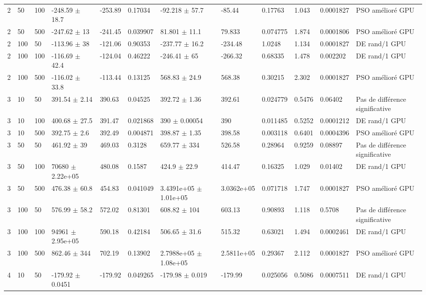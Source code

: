 \begin{table}[t]
\begin{tabular}{llllllllllll}
2 & 50 & 100 & -248.59 $\pm$ 18.7 & -253.89 & 0.17034 & -92.218 $\pm$ 57.7 & -85.44 & 0.17763 & 1.043 & 0.0001827 & PSO amélioré GPU \\
2 & 50 & 500 & -247.62 $\pm$ 13 & -241.45 & 0.039907 & 81.801 $\pm$ 11.1 & 79.833 & 0.074775 & 1.874 & 0.0001806 & PSO amélioré GPU \\
2 & 100 & 50 & -113.96 $\pm$ 38 & -121.06 & 0.90353 & -237.77 $\pm$ 16.2 & -234.48 & 1.0248 & 1.134 & 0.0001827 & DE rand/1 GPU \\
2 & 100 & 100 & -116.69 $\pm$ 42.4 & -124.04 & 0.46222 & -246.41 $\pm$ 65 & -266.32 & 0.68335 & 1.478 & 0.002202 & DE rand/1 GPU \\
2 & 100 & 500 & -116.02 $\pm$ 33.8 & -113.44 & 0.13125 & 568.83 $\pm$ 24.9 & 568.38 & 0.30215 & 2.302 & 0.0001827 & PSO amélioré GPU \\
3 & 10 & 50 & 391.54 $\pm$ 2.14 & 390.63 & 0.04525 & 392.72 $\pm$ 1.36 & 392.61 & 0.024779 & 0.5476 & 0.06402 & Pas de différence significative \\
3 & 10 & 100 & 400.68 $\pm$ 27.5 & 391.47 & 0.021868 & 390 $\pm$ 0.00054 & 390 & 0.011485 & 0.5252 & 0.0001212 & DE rand/1 GPU \\
3 & 10 & 500 & 392.75 $\pm$ 2.6 & 392.49 & 0.004871 & 398.87 $\pm$ 1.35 & 398.58 & 0.003118 & 0.6401 & 0.0004396 & PSO amélioré GPU \\
3 & 50 & 50 & 461.92 $\pm$ 39 & 469.03 & 0.3128 & 659.77 $\pm$ 334 & 526.58 & 0.28964 & 0.9259 & 0.08897 & Pas de différence significative \\
3 & 50 & 100 & 70680 $\pm$ 2.22e+05 & 480.08 & 0.1587 & 424.9 $\pm$ 22.9 & 414.47 & 0.16325 & 1.029 & 0.01402 & DE rand/1 GPU \\
3 & 50 & 500 & 476.38 $\pm$ 60.8 & 454.83 & 0.041049 & 3.4391e+05 $\pm$ 1.01e+05 & 3.0362e+05 & 0.071718 & 1.747 & 0.0001827 & PSO amélioré GPU \\
3 & 100 & 50 & 576.99 $\pm$ 58.2 & 572.02 & 0.81301 & 608.82 $\pm$ 104 & 603.13 & 0.90893 & 1.118 & 0.5708 & Pas de différence significative \\
3 & 100 & 100 & 94961 $\pm$ 2.95e+05 & 590.18 & 0.42184 & 506.65 $\pm$ 31.6 & 515.32 & 0.63021 & 1.494 & 0.0002461 & DE rand/1 GPU \\
3 & 100 & 500 & 862.46 $\pm$ 344 & 702.19 & 0.13902 & 2.7988e+05 $\pm$ 1.08e+05 & 2.5811e+05 & 0.29367 & 2.112 & 0.0001827 & PSO amélioré GPU \\
4 & 10 & 50 & -179.92 $\pm$ 0.0451 & -179.92 & 0.049265 & -179.98 $\pm$ 0.019 & -179.99 & 0.025056 & 0.5086 & 0.0007511 & DE rand/1 GPU \\

\end{tabular}
\end{table}
